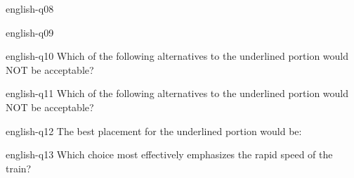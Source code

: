 {\begin{question}{english-q08}
    \begin{choices}
    \end{choices}
\end{question}

\begin{question}{english-q09}
    \begin{choices}
    \end{choices}
\end{question}

\begin{question}{english-q10}
    Which of the following alternatives to the underlined portion would NOT be acceptable?
    \begin{choices}
    \end{choices}
\end{question}

\begin{question}{english-q11}
    Which of the following alternatives to the underlined portion would NOT be acceptable?
    \begin{choices}
    \end{choices}
\end{question}

\begin{question}{english-q12}
    The best placement for the underlined portion would be:
    \begin{choices}
    \end{choices}
\end{question}

\begin{question}{english-q13}
    Which choice most effectively emphasizes the rapid speed of the train?
    \begin{choices}
    \end{choices}
\end{question}

}
